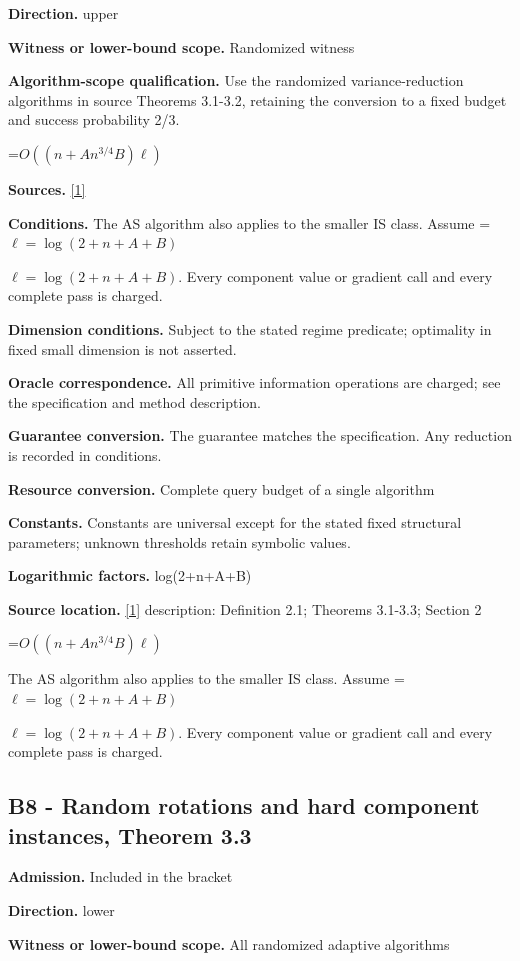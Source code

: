 \documentclass[10pt,a4paper]{article}
\newcommand{\AtlasMath}[1]{\par\begingroup\centering\setbox0=\hbox{$\displaystyle #1$}\ifdim\wd0>1.4\linewidth\typeout{ATLAS WIDE FORMULA: \the\wd0}\fi\ifdim\wd0>\linewidth\resizebox{\linewidth}{!}{\box0}\else\box0\fi\par\endgroup}
\newcommand{\AtlasInlineMath}[1]{\begingroup\setbox0=\hbox{$#1$}\ifdim\wd0>.4\linewidth\endgroup\AtlasMath{#1}\else\endgroup$#1$\fi}
\begin{document}
\textbf{Direction.} upper

\textbf{Witness or lower-bound scope.} Randomized witness

\textbf{Algorithm-scope qualification.} Use the randomized variance-reduction algorithms in source Theorems 3.1-3.2, retaining the conversion to a fixed budget and success probability 2/3.

\AtlasMath{O\!\left((n+An^{3/4}B)\ell\right)}
\textbf{Sources.} \href{https://arxiv.org/pdf/2610.16991v2}{[1]}

\textbf{Conditions.} The AS algorithm also applies to the smaller IS class. Assume \AtlasInlineMath{\ell=\log(2+n+A+B)}. Every component value or gradient call and every complete pass is charged.

\textbf{Dimension conditions.} Subject to the stated regime predicate; optimality in fixed small dimension is not asserted.

\textbf{Oracle correspondence.} All primitive information operations are charged; see the specification and method description.

\textbf{Guarantee conversion.} The guarantee matches the specification. Any reduction is recorded in conditions.

\textbf{Resource conversion.} Complete query budget of a single algorithm

\textbf{Constants.} Constants are universal except for the stated fixed structural parameters; unknown thresholds retain symbolic values.

\textbf{Logarithmic factors.} log(2+n+A+B)

\textbf{Source location.} \href{https://arxiv.org/pdf/2610.16991v2}{[1]} description: Definition 2.1; Theorems 3.1-3.3; Section 2

\AtlasMath{O\!\left((n+An^{3/4}B)\ell\right)}
The AS algorithm also applies to the smaller IS class. Assume \AtlasInlineMath{\ell=\log(2+n+A+B)}. Every component value or gradient call and every complete pass is charged.

\subsection{B8 - Random rotations and hard component instances, Theorem 3.3}
\textbf{Admission.} Included in the bracket

\textbf{Direction.} lower

\textbf{Witness or lower-bound scope.} All randomized adaptive algorithms
\end{document}
